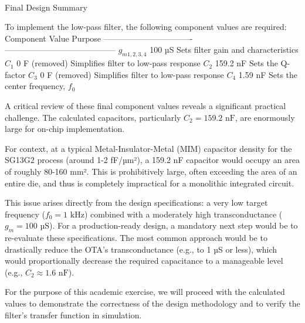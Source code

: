 \documentclass[
  letterpaper,
  DIV=11,
  numbers=noendperiod]{scrreprt}
\makeatletter
\let\oldparagraph\paragraph
\renewcommand{\paragraph}{
    \@ifstar
      \xxxParagraphStar
      \xxxParagraphNoStar
  }
\newcommand{\xxxParagraphStar}[1]{\oldparagraph*{#1}\mbox{}}
\newcommand{\xxxParagraphNoStar}[1]{\oldparagraph{#1}\mbox{}}
\makeatother
\begin{document}
\paragraph{Final Design Summary}\label{final-design-summary}

To implement the low-pass filter, the following component values are
required: \textbar{} Component \textbar{} Value \textbar{} Purpose
\textbar{}
\textbar-----------------\textbar----------------\textbar-----------------------------------------\textbar{}
\textbar{} \(g_{m1,2,3,4}\) \textbar{} 100 µS \textbar{} Sets filter
gain and characteristics \textbar{} \textbar{} \(C_1\) \textbar{} 0 F
(removed) \textbar{} Simplifies filter to low-pass response \textbar{}
\textbar{} \(C_2\) \textbar{} 159.2 nF \textbar{} Sets the Q-factor
\textbar{} \textbar{} \(C_3\) \textbar{} 0 F (removed) \textbar{}
Simplifies filter to low-pass response \textbar{} \textbar{} \(C_4\)
\textbar{} 1.59 nF \textbar{} Sets the center frequency, \(f_0\)
\textbar{}

\begin{tcolorbox}[enhanced jigsaw, bottomrule=.15mm, leftrule=.75mm, breakable, coltitle=black, left=2mm, titlerule=0mm, opacityback=0, rightrule=.15mm, toprule=.15mm, arc=.35mm, colback=white, colbacktitle=quarto-callout-note-color!10!white, bottomtitle=1mm, colframe=quarto-callout-note-color-frame, toptitle=1mm, title=\textcolor{quarto-callout-note-color}{\faInfo}\hspace{0.5em}{A Note on Practicality and Component Values}, opacitybacktitle=0.6]

A critical review of these final component values reveals a significant
practical challenge. The calculated capacitors, particularly
\(C_2 = 159.2 \text{ nF}\), are enormously large for on-chip
implementation.

For context, at a typical Metal-Insulator-Metal (MIM) capacitor density
for the SG13G2 process (around 1-2 fF/µm²), a 159.2 nF capacitor would
occupy an area of roughly 80-160 mm². This is prohibitively large, often
exceeding the area of an entire die, and thus is completely impractical
for a monolithic integrated circuit.

This issue arises directly from the design specifications: a very low
target frequency (\(f_0 = 1 \text{ kHz}\)) combined with a moderately
high transconductance (\(g_m = 100 \text{ µS}\)). For a production-ready
design, a mandatory next step would be to re-evaluate these
specifications. The most common approach would be to drastically reduce
the OTA's transconductance (e.g., to 1 µS or less), which would
proportionally decrease the required capacitance to a manageable level
(e.g., \(C_2 \approx 1.6 \text{ nF}\)).

For the purpose of this academic exercise, we will proceed with the
calculated values to demonstrate the correctness of the design
methodology and to verify the filter's transfer function in simulation.

\end{tcolorbox}
\end{document}
